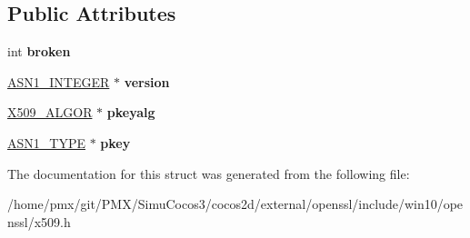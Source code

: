 \subsection*{Public Attributes}
\begin{DoxyCompactItemize}
\item 
\mbox{\label{structpkcs8__priv__key__info__st_a0c1159bfe2a447810dc518175c77c225}} 
int {\bfseries broken}
\item 
\mbox{\label{structpkcs8__priv__key__info__st_a5e3bdcbf50b8971fcb60a8f7d71a36fb}} 
\hyperlink{structasn1__string__st}{A\+S\+N1\+\_\+\+I\+N\+T\+E\+G\+ER} $\ast$ {\bfseries version}
\item 
\mbox{\label{structpkcs8__priv__key__info__st_af94f0f4f185de14be5b0b88bb638b3e8}} 
\hyperlink{structX509__algor__st}{X509\+\_\+\+A\+L\+G\+OR} $\ast$ {\bfseries pkeyalg}
\item 
\mbox{\label{structpkcs8__priv__key__info__st_aba8fbcabba1fdcf6ff0f41901a9b042c}} 
\hyperlink{structasn1__type__st}{A\+S\+N1\+\_\+\+T\+Y\+PE} $\ast$ {\bfseries pkey}
\end{DoxyCompactItemize}


The documentation for this struct was generated from the following file\+:\begin{DoxyCompactItemize}
\item 
/home/pmx/git/\+P\+M\+X/\+Simu\+Cocos3/cocos2d/external/openssl/include/win10/openssl/x509.\+h\end{DoxyCompactItemize}
